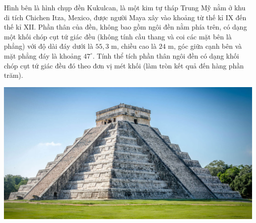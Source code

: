 \begin{bt}%
	Hình bên là hình chụp đền Kukulcan, là một kim tự tháp Trung Mỹ nằm ở khu di tích Chichen Itza, Mexico, được người Maya xây vào khoảng từ thế kỉ IX đến thế kỉ XII. Phần thân của đền, không bao gồm ngôi đền nằm phía trên, có dạng một khối chóp cụt tứ giác đều (không tính cầu thang và coi các mặt bên là phẳng) với độ dài đáy dưới là $55{,}3$ m, chiều cao là $24$ m, góc giữa cạnh bên và mặt phẳng đáy là khoảng $47^\circ$. Tính thể tích phần thân ngôi đền có dạng khối chóp cụt tứ giác đều đó theo đơn vị mét khối (làm tròn kết quả đến hàng phần trăm).
	\begin{center}
	\includegraphics[scale=0.15]{HINHVE/CD/thapmaya.jpg}
	\end{center}
\end{bt}
